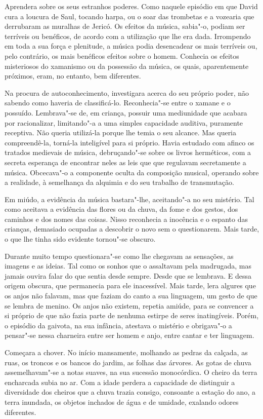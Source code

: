 Aprendera sobre os seus estranhos poderes. Como naquele episódio em que
David cura a loucura de Saul, tocando harpa, ou o soar das trombetas e a
vozearia que derrubaram as muralhas de Jericó. Os efeitos da música,
sabia"-o, podiam ser terríveis ou benéficos, de acordo com a utilização
que lhe era dada. Irrompendo em toda a sua força e plenitude, a música
podia desencadear os mais terríveis ou, pelo contrário, os mais
benéficos efeitos sobre o homem. Conhecia os efeitos misteriosos do
xamanismo ou da possessão da música, os quais, aparentemente próximos,
eram, no entanto, bem diferentes.

Na procura de autoconhecimento, investigara acerca do seu próprio
poder, não sabendo como haveria de classificá-lo. Reconhecia"-se entre o
xamane e o possuído. Lembrava"-se de, em criança, possuir uma mediunidade
que acabara por racionalizar, limitando"-a a uma simples capacidade
auditiva, puramente receptiva. Não queria utilizá-la porque lhe temia o
seu alcance. Mas queria compreendê-la, torná-la inteligível para si
próprio. Havia estudado com afinco os tratados medievais de música,
debruçando"-se sobre os livros herméticos, com a secreta esperança de
encontrar neles as leis que que regulavam secretamente a música.
Obcecava"-o a componente oculta da composição musical, operando sobre a
realidade, à semelhança da alquimia e do seu trabalho de transmutação.

Em miúdo, a evidência da música bastara"-lhe, aceitando"-a no seu
mistério. Tal como aceitava a evidência das flores ou da chuva, da fome
e dos gestos, dos caminhos e dos nomes das coisas. Nisso reconhecia a
inocência e o espanto das crianças, demasiado ocupadas a descobrir o
novo sem o questionarem. Mais tarde, o que lhe tinha sido evidente
tornou"-se obscuro.

Durante muito tempo questionara"-se como lhe chegavam as sensações, as
imagens e as ideias. Tal como os sonhos que o assaltavam pela madrugada,
mas jamais ouvira falar do que sentia desde sempre. Desde que se
lembrava. E dessa origem obscura, que permanecia para ele inacessível.
Mais tarde, lera algures que os anjos não falavam, mas que faziam do
canto a sua linguagem, um gesto de que se lembra de menino. Os anjos não
existem, repetia amiúde, para se convencer a si próprio de que não fazia
parte de nenhuma estirpe de seres inatingíveis. Porém, o episódio da
gaivota, na sua infância, atestava o mistério e obrigava"-o a pensar"-se
nessa charneira entre ser homem e anjo, entre cantar e ter linguagem.

Começara a chover. No início mansamente, molhando as pedras da calçada,
as ruas, os troncos e os bancos do jardim, as folhas das árvores. As
gotas de chuva assemelhavam"-se a notas suaves, na sua sucessão
monocórdica. O cheiro da terra encharcada subia no ar. Com a idade
perdera a capacidade de distinguir a diversidade dos cheiros que a chuva
trazia consigo, consoante a estação do ano, a terra inundada, os
objetos inchados de água e de umidade, exalando odores diferentes.

